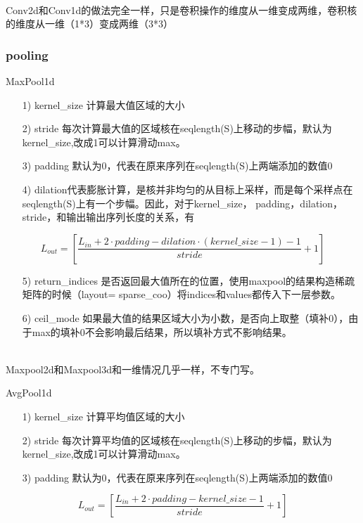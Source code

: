 \documentclass[11pt]{ctexart}
\begin{document}
~\\
Conv2d和Conv1d的做法完全一样，只是卷积操作的维度从一维变成两维，卷积核的维度从一维（1*3）变成两维（3*3）

\subsubsection{pooling}
MaxPool1d
\begin{itemize}
  \item [1)]
  kernel\_size 计算最大值区域的大小
  \item [2)]
  stride 每次计算最大值的区域核在seqlength(S)上移动的步幅，默认为kernel\_size,改成1可以计算滑动max。
  \item [3)]
  padding 默认为0，代表在原来序列在seqlength(S)上两端添加的数值0
  \item [4)]
  dilation代表膨胀计算，是核并非均匀的从目标上采样，而是每个采样点在seqlength(S)上有一个步幅。因此，对于kernel\_size， padding，dilation，stride，和输出输出序列长度的关系，有
\end{itemize}

$$L_{out} = \left[ \frac{L_{in} + 2 \cdot padding - dilation \cdot (kernel\_size -1) -1}{stride} + 1 \right]$$

\begin{itemize}
  \item [5)]
  return\_indices 是否返回最大值所在的位置，使用maxpool的结果构造稀疏矩阵的时候（layout= sparse\_coo）将indices和values都传入下一层参数。
  \item [6)]
  ceil\_mode 如果最大值的结果区域大小为小数，是否向上取整（填补0），由于max的填补0不会影响最后结果，所以填补方式不影响结果。

\end{itemize}

~\\
Maxpool2d和Maxpool3d和一维情况几乎一样，不专门写。

AvgPool1d
\begin{itemize}
  \item [1)]
  kernel\_size 计算平均值区域的大小
  \item [2)]
  stride 每次计算平均值的区域核在seqlength(S)上移动的步幅，默认为kernel\_size,改成1可以计算滑动max。
  \item [3)]
  padding 默认为0，代表在原来序列在seqlength(S)上两端添加的数值0

\end{itemize}

$$L_{out} = \left[ \frac{L_{in} + 2 \cdot padding -  kernel\_size -1}{stride} + 1 \right]$$
\end{document}

